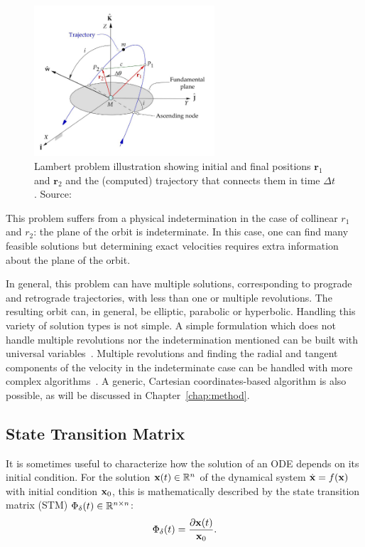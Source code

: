 \begin{figure}[htbp]
    \centering
    \includegraphics[width=0.6\textwidth]{img/lambert_from_curtis.png}
    \caption{Lambert problem illustration showing initial and final positions \(\mathbf{r}_1\) and \(\mathbf{r}_2\) and the (computed) trajectory that connects them in time \(\Delta t\). Source: \cite{curtis2015orbital}}
    \label{fig:lambert_diagram}
\end{figure}

This problem suffers from a physical indetermination in the case of collinear \(r_1\) and \(r_2\): the plane of the orbit is indeterminate. In this case, one can find many feasible solutions but determining exact velocities requires extra information about the plane of the orbit.\

In general, this problem can have multiple solutions, corresponding to prograde and retrograde trajectories, with less than one or multiple revolutions. The resulting orbit can, in general, be elliptic, parabolic or hyperbolic. Handling this variety of solution types is not simple. A simple formulation which does not handle multiple revolutions nor the indetermination mentioned can be built with universal variables~\cite{curtis2015orbital}. Multiple revolutions and finding the radial and tangent components of the velocity in the indeterminate case can be handled with more complex algorithms~\cite{sukhanov}. A generic, Cartesian coordinates-based algorithm is also possible, as will be discussed in Chapter~\ref{chap:method}.

\subsection{State Transition Matrix}

It is sometimes useful to characterize how the solution of an ODE depends on its initial condition. For the solution \(\mathbf{x}(t) \in \mathbb{R}^n\) of the dynamical system \(\dot{\mathbf{x}} = f(\mathbf{x})\) with initial condition \(\mathbf{x}_0\), this is mathematically described by the state transition matrix (STM) \(\Phi_\delta(t) \in \mathbb{R}^{n \times n}\):
\begin{equation}\label{eq:stm_def}
    \Phi_\delta(t) = \frac{\partial \x(t)}{\x_0}.
\end{equation}

